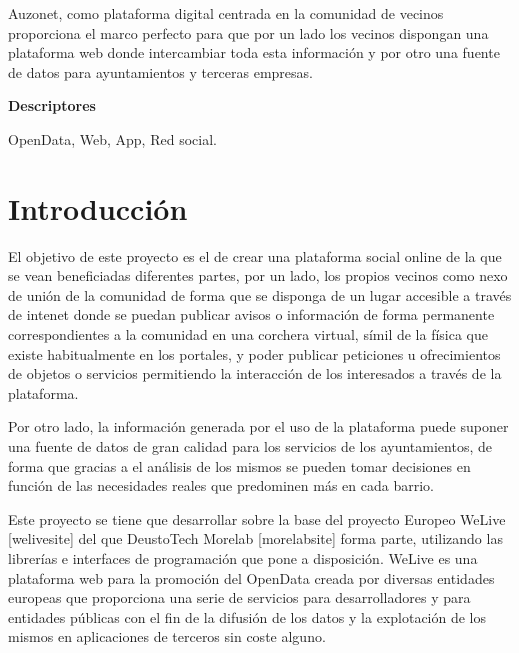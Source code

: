 \documentclass{DeustoFDP}
\begin{document}
Auzonet, como plataforma digital centrada en la comunidad de vecinos proporciona
el marco perfecto para que por un lado los vecinos dispongan una plataforma web
donde intercambiar toda esta información y por otro una fuente de datos para
ayuntamientos y terceras empresas.

\vspace{2em}

{\Large\bfseries\sectionfont Descriptores}
\vspace{3\medskipamount}

OpenData, Web, App, Red social.

\cleardoublepage\tableofcontents
\cleardoublepage\listoffigures
\cleardoublepage\listoftables
\cleardoublepage\listoflistings

\mainmatter
\pagestyle{phdthesis}

\chapter{Introducción}\label{cha:introduccion}
El objetivo de este proyecto es el de crear una plataforma social online de la que se vean beneficiadas diferentes partes, por un lado, los propios vecinos como nexo de unión de la comunidad de forma que se disponga de un lugar accesible a través de intenet donde se puedan publicar avisos o información de forma permanente correspondientes a la comunidad en una corchera virtual, símil de la física que existe habitualmente en los portales, y poder publicar peticiones u ofrecimientos de objetos o servicios permitiendo la interacción de los interesados a través de la plataforma.

Por otro lado, la información generada por el uso de la plataforma puede suponer una fuente de datos de gran calidad para los servicios de los ayuntamientos, de forma que gracias a el análisis de los mismos se pueden tomar decisiones en función de las necesidades reales que predominen más en cada barrio.

Este proyecto se tiene que desarrollar sobre la base del proyecto Europeo WeLive [welivesite] del que DeustoTech Morelab [morelabsite] forma parte, utilizando las librerías e interfaces de programación que pone a disposición. WeLive es una plataforma web para la promoción del OpenData creada por diversas entidades europeas que proporciona una serie de servicios para desarrolladores y para entidades públicas con el fin de la difusión de los datos y la explotación de los mismos en aplicaciones de terceros sin coste alguno.
\end{document}
